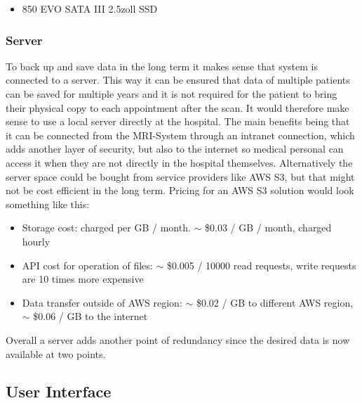 \documentclass[conference]{IEEEtran}
\begin{document}
        \begin{itemize}
            \item 850 EVO SATA III 2.5zoll SSD \cite{SSD}
        \end{itemize}   
        
    \subsubsection{Server}

    To back up and save data in the long term it makes sense that system is connected to a server. This way it can be ensured that data of multiple patients can be saved for multiple years and it is not required for the patient to bring their physical copy to each appointment after the scan.
    It would therefore make sense to use a local server directly at the hospital. The main benefits being that it can be connected from the MRI-System through an intranet connection, which adds another layer of security, but also to the internet so medical personal can access it when they are not directly in the hospital themselves.
    Alternatively the server space could be bought from service providers like AWS S3, but that might not be cost efficient in the long term. Pricing for an AWS S3 solution would look something like this:
        
        \begin{itemize}
            \item Storage cost: charged per GB / month. $\sim$ \$0.03 / GB / month, charged hourly
            \item API cost for operation of files: $\sim$ \$0.005 / 10000 read requests, write requests are 10 times more expensive
            \item Data transfer outside of AWS region: $\sim$ \$0.02 / GB to different AWS region, $\sim$ \$0.06 / GB to the internet \cite{AWS}
        \end{itemize}    

    Overall a server adds another point of redundancy since the desired data is now available at two points.
    
    \subsection{User Interface}
\end{document}
